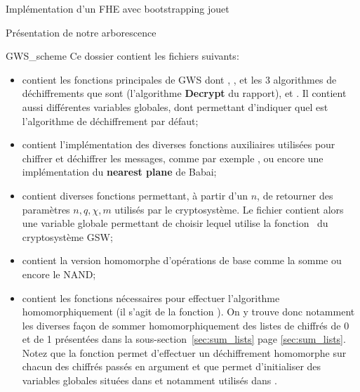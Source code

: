 \begin{section}{Implémentation d'un FHE avec bootstrapping \og{}jouet\fg~{}}
\begin{subsection}{Présentation de notre arborescence}
\begin{subsubsection}{GWS\_scheme}
Ce dossier contient les fichiers suivants:
\begin{itemize}
\item {} contient les fonctions principales de GWS dont , ,  et les 3
algorithmes de déchiffrements que sont  (l'algorithme \textbf{Decrypt} du rapport), 
et . Il contient aussi différentes variables globales, dont  permettant d'indiquer
quel est l'algorithme de déchiffrement par défaut;
\item {} contient l'implémentation des diverses fonctions auxiliaires utilisées pour
chiffrer et déchiffrer les messages, comme par exemple , ou encore une implémentation du \textbf{nearest plane} de
Babai;
\item {} contient diverses fonctions permettant, à partir d'un $n$, de retourner des paramètres
$n, q, \chi, m$ utilisés par le cryptosystème. Le fichier  contient alors une variable globale
 permettant de choisir lequel utilise la fonction  du cryptosystème GSW; 
\item {} contient la version homomorphe
	d'opérations de base comme la somme ou encore le NAND;
\item {} contient les fonctions nécessaires pour
	effectuer l'algorithme  homomorphiquement (il s'agit de la fonction ).
	On y trouve donc notamment les diverses façon de sommer homomorphiquement des listes de chiffrés de 0 et de
	1 présentées dans la sous-section~\ref{sec:sum_lists} page \ref{sec:sum_lists}. Notez que la fonction
	 permet d'effectuer un déchiffrement homomorphe sur chacun des chiffrés passés
	en argument et que  permet d'initialiser des variables globales  situées dans  et notamment utilisés dans
	. 
	\end{itemize}
\end{subsubsection} %


\end{subsection}
\end{section}
